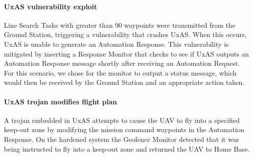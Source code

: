 \paragraph{UxAS vulnerability exploit} Line Search Tasks with greater than 90 waypoints were transmitted from the Ground Station, triggering a vulnerability that crashes UxAS.   When this occurs, UxAS is unable to generate an Automation Response.  
This vulnerability is mitigated by inserting a Response Monitor that checks to see if UxAS outputs an Automation Response message shortly after receiving an Automation Request.  For this scenario, we chose for the monitor to output a status message, which would then be received by the Ground Station and an appropriate action taken.

\paragraph{UxAS trojan modifies flight plan} A trojan embedded in UxAS attempts to cause the UAV to fly into a specified keep-out zone by modifying the mission command waypoints in the Automation Response.  
On the hardened system the Geofence Monitor detected that it was being instructed to fly into a keep-out zone and returned the UAV to Home Base.



